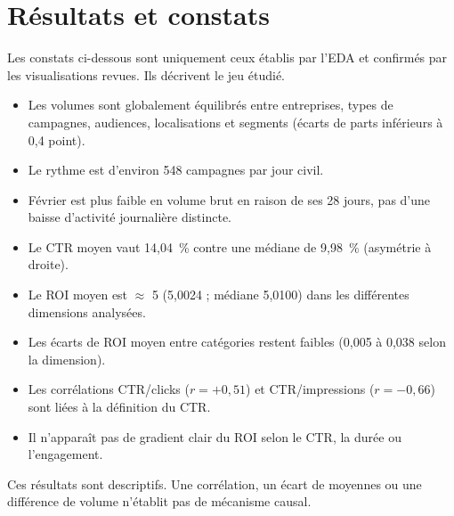 \chapter{Résultats et constats}
\label{chap:resultats}

Les constats ci-dessous sont uniquement ceux établis par l'EDA et confirmés par les visualisations revues. Ils décrivent le jeu étudié.

\begin{keyfindings}
\begin{itemize}
\item Les volumes sont globalement équilibrés entre entreprises, types de campagnes, audiences, localisations et segments (écarts de parts inférieurs à 0,4 point).
\item Le rythme est d'environ 548 campagnes par jour civil.
\item Février est plus faible en volume brut en raison de ses 28 jours, pas d'une baisse d'activité journalière distincte.
\item Le CTR moyen vaut 14,04~\% contre une médiane de 9,98~\% (asymétrie à droite).
\item Le ROI moyen est $\approx$ 5 (5,0024 ; médiane 5,0100) dans les différentes dimensions analysées.
\item Les écarts de ROI moyen entre catégories restent faibles (0,005 à 0,038 selon la dimension).
\item Les corrélations CTR/clicks ($r = +0,51$) et CTR/impressions ($r = -0,66$) sont liées à la définition du CTR.
\item Il n'apparaît pas de gradient clair du ROI selon le CTR, la durée ou l'engagement.
\end{itemize}
\end{keyfindings}

\begin{warningbox}
Ces résultats sont descriptifs. Une corrélation, un écart de moyennes ou une différence de volume n'établit pas de mécanisme causal.
\end{warningbox}
